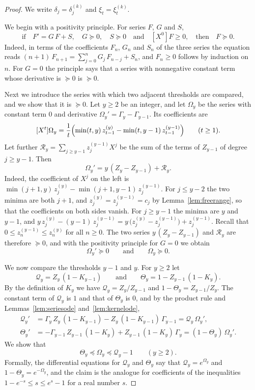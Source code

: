 \documentclass{amsart}
\theoremstyle{definition}
\theoremstyle{remark}
\numberwithin{equation}{section}
\begin{document}
\begin{proof}
We write $\delta_j=\delta^{(k)}_j$ and $\xi_t=\xi^{(k)}_t$.

We begin with a positivity principle. For series $F$, $G$ and $S$,
\[
\text{if}\quad F'=G\,F+S,\quad G\succeq 0,\quad S\succeq 0\quad\text{and}\quad [X^0]F\ge 0,\quad\text{then}\quad F\succeq 0 .
\]
Indeed, in terms of the coefficients $F_n$, $G_n$ and $S_n$ of the three series the equation reads $(n+1)\,F_{n+1}=\sum_{j=0}^{n}G_j\,F_{n-j}+S_n$, and $F_n\ge 0$ follows by induction on $n$. For $G=0$ the principle says that a series with nonnegative constant term whose derivative is $\succeq 0$ is $\succeq 0$.

Next we introduce the series with which two adjacent thresholds are compared, and we show that it is $\succeq 0$. Let $y\ge 2$ be an integer, and let $\Omega_y$ be the series with constant term $0$ and derivative $\Omega_y'=\Gamma_y-\Gamma_{y-1}$. Its coefficients are
\begin{equation}\label{eq:series-log-coefficients}
[X^t]\Omega_y=\frac{1}{t}\Bigl(\min(t,y)\,z^{(y)}_{t-1}-\min(t,y-1)\,z^{(y-1)}_{t-1}\Bigr)\qquad(t\ge 1).
\end{equation}
Let further $\mathcal{R}_y=\sum_{j\ge y-1}z^{(y-1)}_jX^j$ be the sum of the terms of $Z_{y-1}$ of degree $j\ge y-1$. Then
\[
\Omega_y'=y\,(Z_y-Z_{y-1})+\mathcal{R}_y .
\]
Indeed, the coefficient of $X^j$ on the left is $\min(j+1,y)\,z^{(y)}_j-\min(j+1,y-1)\,z^{(y-1)}_j$. For $j\le y-2$ the two minima are both $j+1$, and $z^{(y)}_j=z^{(y-1)}_j=c_j$ by Lemma~\ref{lem:freerange}, so that the coefficients on both sides vanish. For $j\ge y-1$ the minima are $y$ and $y-1$, and $y\,z^{(y)}_j-(y-1)\,z^{(y-1)}_j=y\,\bigl(z^{(y)}_j-z^{(y-1)}_j\bigr)+z^{(y-1)}_j$. Recall that $0\le z^{(y-1)}_n\le z^{(y)}_n$ for all $n\ge 0$. The two series $y\,(Z_y-Z_{y-1})$ and $\mathcal{R}_y$ are therefore $\succeq 0$, and with the positivity principle for $G=0$ we obtain
\[
\Omega_y'\succeq 0\qquad\text{and}\qquad \Omega_y\succeq 0 .
\]

We now compare the thresholds $y-1$ and $y$. For $y\ge 2$ let
\[
\mathcal{Q}_y=Z_y\,(1-K_{y-1})\qquad\text{and}\qquad \Theta_y=1-Z_{y-1}\,(1-K_y) .
\]
By the definition of $K_y$ we have $\mathcal{Q}_y=Z_y/Z_{y-1}$ and $1-\Theta_y=Z_{y-1}/Z_y$. The constant term of $\mathcal{Q}_y$ is $1$ and that of $\Theta_y$ is $0$, and by the product rule and Lemmas~\ref{lem:seriesode} and~\ref{lem:kernelode},
\begin{align*}
\mathcal{Q}_y'&=\Gamma_y\,Z_y\,(1-K_{y-1})-Z_y\,(1-K_{y-1})\,\Gamma_{y-1}=\mathcal{Q}_y\,\Omega_y' ,\\
\Theta_y'&=-\Gamma_{y-1}\,Z_{y-1}\,(1-K_y)+Z_{y-1}\,(1-K_y)\,\Gamma_y=(1-\Theta_y)\,\Omega_y' .
\end{align*}
We show that
\begin{equation}\label{eq:series-comparison}
\Theta_y\preceq \Omega_y\preceq \mathcal{Q}_y-1\qquad(y\ge 2).
\end{equation}
Formally, the differential equations for $\mathcal{Q}_y$ and $\Theta_y$ say that $\mathcal{Q}_y=e^{\Omega_y}$ and $1-\Theta_y=e^{-\Omega_y}$, and the claim is the analogue for coefficients of the inequalities $1-e^{-s}\le s\le e^{s}-1$ for a real number $s$.


\end{proof}
\end{document}
